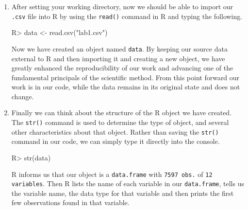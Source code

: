 \documentclass{article}
\newenvironment{Schunk}{}{}
\newcommand{\code}[1]{\texttt{#1}}
\newcommand{\proglang}[1]{\textsf{#1}}
\begin{document}
{\begin{enumerate}[leftmargin=15mm]
\begin{enumerate}[label=\Alph*.  ]
\begin{Schunk}
\begin{Sinput}

R> setwd("H:\\lab1")

\end{Sinput}
\end{Schunk}

\item After setting your working directory, now we should be able to import our \code{.csv} file into R by using the \code{read()} command in \proglang{R} and typing the following.

\begin{Schunk}
\begin{Sinput}

R> data <- read.csv("lab1.csv")

\end{Sinput}
\end{Schunk}

Now we have created an object named \code{data}.  By keeping our source data external to \proglang{R} and then importing it and creating a new object, we have greatly enhanced the reproducibility of our work and advancing one of the fundamental principals of the scientific method.  From this point forward our work is in our code, while the data remains in its original state and does not change. \\ %

\item Finally we can think about the structure of the \proglang{R} object we have created.  The \code{str()} command is used to determine the type of object, and several other characteristics about that object.  Rather than saving the \code{str()} command in our code, we can simply type it directly into the console.

\begin{Schunk}
\begin{Sinput}

R> str(data)

\end{Sinput}
\end{Schunk}

\proglang{R} informs us that our object is a \code{data.frame} with \code{7597 obs.} of \code{12 variables}.  Then \proglang{R} lists the name of each variable in our \code{data.frame}, tells us the variable name, the data type for that variable and then prints the first few observations found in that variable.


\end{enumerate}
\end{enumerate}}
\end{document}
